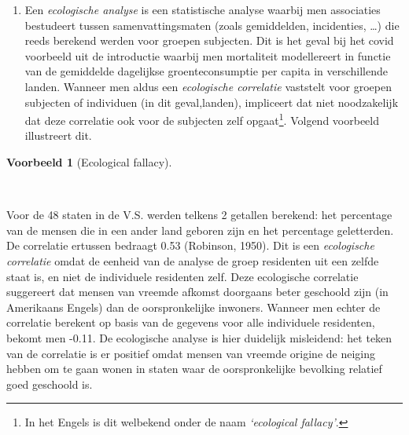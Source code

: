 \documentclass[
  dutch,
  letterpaper,
  12pt]{book}
\theoremstyle{definition}
\theoremstyle{definition}
\theoremstyle{definition}
\newtheorem{example}{Voorbeeld}[chapter]
\theoremstyle{remark}
\begin{document}
\begin{enumerate}
  algemeen\footnote{In het Engels is dit welbekend onder de zinsnede
    \emph{`Association is not causation!'}.} hoeft een correlatie tussen
  2 variabelen niet te impliceren dat er een causaal verband is. De
  relatie tussen 2 metingen kan immers sterk verstoord worden door
  confounders (bvb. de leeftijd in bovenstaand voorbeeld). Hoewel dit
  overduidelijk is in bovenstaand voorbeeld, is het in vele andere
  contexten veel minder duidelijk en worden er, vooral in de populaire
  literatuur, vaak causale beweringen gemaakt die niet (volledig) door
  de gegevens worden gestaafd. Volgend voorbeeld illustreert dit. Denk
  hierbij aan het voorbeeld van de associatie van groente consumptie en
  covid mortaliteit.
\item
  Een \emph{ecologische analyse} is een statistische analyse waarbij men
  associaties bestudeert tussen samenvattingsmaten (zoals gemiddelden,
  incidenties, \ldots) die reeds berekend werden voor groepen subjecten.
  Dit is het geval bij het covid voorbeeld uit de introductie waarbij
  men mortaliteit modellereert in functie van de gemiddelde dagelijkse
  groenteconsumptie per capita in verschillende landen. Wanneer men
  aldus een \emph{ecologische correlatie} vaststelt voor groepen
  subjecten of individuen (in dit geval,landen), impliceert dat niet
  noodzakelijk dat deze correlatie ook voor de subjecten zelf
  opgaat\footnote{In het Engels is dit welbekend onder de naam
    \emph{`ecological fallacy'}.}. Volgend voorbeeld illustreert dit.
\end{enumerate}

\begin{example}[Ecological
fallacy]\protect\hypertarget{exm-ecological-fallacy}{}\label{exm-ecological-fallacy}

~

\end{example}

Voor de 48 staten in de V.S. werden telkens 2 getallen berekend: het
percentage van de mensen die in een ander land geboren zijn en het
percentage geletterden. De correlatie ertussen bedraagt 0.53 (Robinson,
1950). Dit is een \emph{ecologische correlatie} omdat de eenheid van de
analyse de groep residenten uit een zelfde staat is, en niet de
individuele residenten zelf. Deze ecologische correlatie suggereert dat
mensen van vreemde afkomst doorgaans beter geschoold zijn (in Amerikaans
Engels) dan de oorspronkelijke inwoners. Wanneer men echter de
correlatie berekent op basis van de gegevens voor alle individuele
residenten, bekomt men -0.11. De ecologische analyse is hier duidelijk
misleidend: het teken van de correlatie is er positief omdat mensen van
vreemde origine de neiging hebben om te gaan wonen in staten waar de
oorspronkelijke bevolking relatief goed geschoold is.
\end{document}
